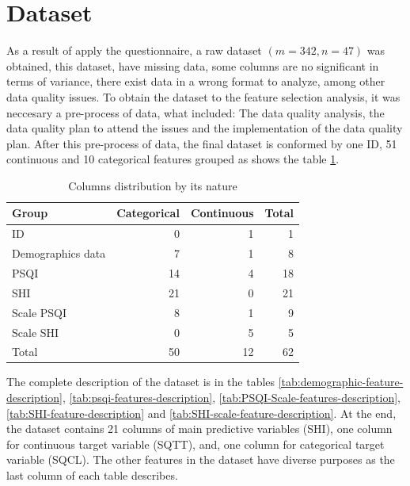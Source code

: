\documentclass[]{book}
\begin{document}
\section{Dataset}\label{dataset}

As a result of apply the questionnaire, a raw dataset \((m=342, n=47)\)
was obtained, this dataset, have missing data, some columns are no
significant in terms of variance, there exist data in a wrong format to
analyze, among other data quality issues. To obtain the dataset to the
feature selection analysis, it was neccesary a pre-process of data, what
included: The data quality analysis, the data quality plan to attend the
issues and the implementation of the data quality plan. After this
pre-process of data, the final dataset is conformed by one ID, 51
continuous and 10 categorical features grouped as shows the table
\ref{tab:dataset-columns-distribution}.

\begin{table}[ht]
\centering
\caption{Columns distribution by its nature}
\label{tab:dataset-columns-distribution}
\begin{tabular}{lrrr}
\hline
Group             & Categorical & Continuous & Total \\ \hline
ID                & 0           & 1          & 1     \\
Demographics data & 7           & 1          & 8     \\
PSQI              & 14          & 4          & 18    \\
SHI               & 21          & 0          & 21    \\
Scale PSQI        & 8           & 1          & 9     \\
Scale SHI         & 0           & 5          & 5     \\ \hline
Total             & 50          & 12         & 62    \\ \hline
\end{tabular}
\end{table}

The complete description of the dataset is in the tables
\ref{tab:demographic-feature-description},
\ref{tab:psqi-features-description},
\ref{tab:PSQI-Scale-features-description},
\ref{tab:SHI-feature-description} and
\ref{tab:SHI-scale-feature-description}. At the end, the dataset
contains 21 columns of main predictive variables (SHI), one column for
continuous target variable (SQTT), and, one column for categorical
target variable (SQCL). The other features in the dataset have diverse
purposes as the last column of each table describes.
\end{document}
